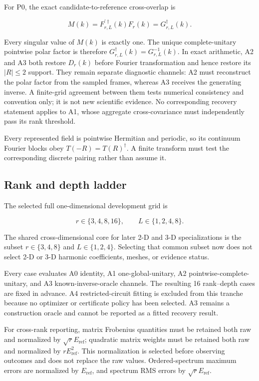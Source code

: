 \documentclass[11pt]{article}
\begin{document}
For P0, the exact candidate-to-reference cross-overlap is

\[
M(k)=F_{r,L}^{\prime\dagger}(k)F_r(k)=G_{r,L}^{\dagger}(k).
\]

Every singular value of $M(k)$ is exactly one. The unique complete-unitary pointwise
polar factor is therefore $G_{r,L}^{\dagger}(k)=G_{r,L}^{-1}(k)$. In exact arithmetic,
A2 and A3 both restore $D_r(k)$ before Fourier transformation and hence restore its
$|R|\leq2$ support. They remain separate diagnostic channels: A2 must reconstruct the
polar factor from the sampled frames, whereas A3 receives the generating inverse. A
finite-grid agreement between them tests numerical consistency and convention only; it is not
new scientific evidence. No corresponding recovery statement applies to A1, whose
aggregate cross-covariance must independently pass its rank threshold.

Every represented field is pointwise Hermitian and periodic, so its continuum Fourier
blocks obey $T(-R)=T(R)^\dagger$. A finite transform must test the corresponding discrete
pairing rather than assume it.

\subsection{Rank and depth ladder}

The selected full one-dimensional development grid is

\[
r\in\{3,4,8,16\},
\qquad
L\in\{1,2,4,8\}.
\]

The shared cross-dimensional core for later 2-D and 3-D specializations is the subset
$r\in\{3,4,8\}$ and $L\in\{1,2,4\}$. Selecting that common subset now does not select
2-D or 3-D harmonic coefficients, meshes, or evidence status.

Every case evaluates A0 identity, A1 one-global-unitary, A2 pointwise-complete-unitary,
and A3 known-inverse-oracle channels. The resulting 16 rank--depth cases are fixed in
advance. A4 restricted-circuit fitting is excluded from this tranche because no optimizer
or certificate policy has been selected. A3 remains a construction oracle and
cannot be reported as a fitted recovery result.

For cross-rank reporting, matrix Frobenius quantities must be retained both raw and
normalized by $\sqrt rE_{\mathrm{ref}}$; quadratic matrix weights must be retained both
raw and normalized by $rE_{\mathrm{ref}}^2$. This normalization is selected before
observing outcomes and does not replace the raw values. Ordered-spectrum maximum errors
are normalized by $E_{\mathrm{ref}}$, and spectrum RMS errors by
$\sqrt rE_{\mathrm{ref}}$.
\end{document}
